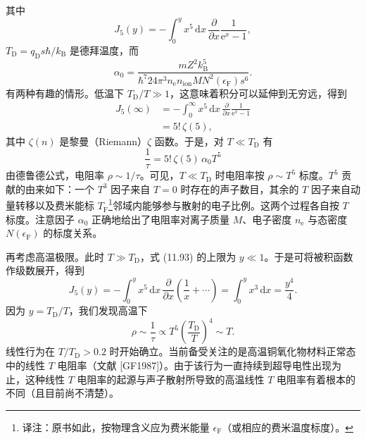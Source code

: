 其中
\begin{equation*}
J_5(y)=-\int_0^y x^5\,\mathrm{d}x\,\frac{\partial}{\partial x}\frac{1}{\mathrm{e}^x-1},\tag{11.93}
\end{equation*}
$T_{\mathrm{D}}=q_{\mathrm{D}}s\hbar/k_{\mathrm{B}}$ 是德拜温度，而
\begin{equation*}
\alpha_0=\frac{mZ^2k_{\mathrm{B}}^5}{\hbar^7 24\pi^3 n_{\mathrm{e}}n_{\mathrm{ion}}MN^2(\epsilon_{\mathrm{F}})s^6}.\tag{11.94}
\end{equation*}
有两种有趣的情形。低温下 $T_{\mathrm{D}}/T\gg 1$，这意味着积分可以延伸到无穷远，得到
\begin{align*}
J_5(\infty)&=-\int_0^{\infty}x^5\,\mathrm{d}x\,\frac{\partial}{\partial x}\frac{1}{\mathrm{e}^x-1}\\
&=5!\,\zeta(5),\tag{11.95}
\end{align*}
其中 $\zeta(n)$ 是黎曼（Riemann）$\zeta$ 函数。于是，对 $T\ll T_{\mathrm{D}}$ 有
\begin{equation*}
\frac{1}{\tau}=5!\,\zeta(5)\,\alpha_0T^5\tag{11.96}
\end{equation*}
由德鲁德公式，电阻率 $\rho\sim 1/\tau$。可见，$T\ll T_{\mathrm{D}}$ 时电阻率按 $\rho\sim T^5$ 标度。$T^5$ 贡献的由来如下：一个 $T^3$ 因子来自 $T=0$ 时存在的声子数目，其余的 $T$ 因子来自动量转移以及费米能标 $T_{\mathrm{F}}$\footnote{译注：原书如此，按物理含义应为费米能量 $\epsilon_{\mathrm{F}}$（或相应的费米温度标度）。}邻域内能够参与散射的电子比例。这两个过程各自按 $T$ 标度。注意因子 $\alpha_0$ 正确地给出了电阻率对离子质量 $M$、电子密度 $n_{\mathrm{e}}$ 与态密度 $N(\epsilon_{\mathrm{F}})$ 的标度关系。

再考虑高温极限。此时 $T\gg T_{\mathrm{D}}$，式 (11.93) 的上限为 $y\ll 1$。于是可将被积函数作级数展开，得到
\begin{equation*}
J_5(y)=-\int_0^y x^5\,\mathrm{d}x\,\frac{\partial}{\partial x}\left(\frac{1}{x}+\cdots\right)=\int_0^y x^3\,\mathrm{d}x=\frac{y^4}{4}.\tag{11.97}
\end{equation*}
因为 $y=T_{\mathrm{D}}/T$，我们发现高温下
\begin{equation*}
\rho\sim\frac{1}{\tau}\propto T^5\left(\frac{T_{\mathrm{D}}}{T}\right)^4\sim T.\tag{11.98}
\end{equation*}
线性行为在 $T/T_{\mathrm{D}}>0.2$ 时开始确立。当前备受关注的是高温铜氧化物材料正常态中的线性 $T$ 电阻率（文献 [GF1987]）。由于该行为一直持续到超导电性出现为止，这种线性 $T$ 电阻率的起源与声子散射所导致的高温线性 $T$ 电阻率有着根本的不同（且目前尚不清楚）。


